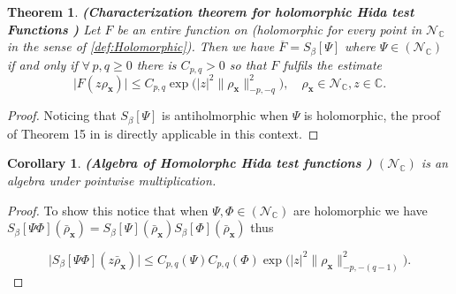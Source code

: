 \documentclass{elsarticle}%
\newtheorem{theorem}{Theorem}[section]%
\newtheorem{corollary}[corollary]{Corollary}%
\begin{document}
\begin{theorem} \textbf{(Characterization theorem for holomorphic Hida test Functions \cite{kondratievGeneralizedFunctionals1996})}
    Let $F$ be an entire function on  (holomorphic for every  point in $\mathcal{N}_{\mathbb{C}}$ in the sense of  \autoref{def:Holomorphic}).  Then we have $\overline{F}=S_{\beta}[\Psi]$ where $\Psi\in (\mathcal{N}_\mathbb{C})$ if and only if $\forall\,p,q\geq 0$ there is $C_{p,q}>0$ so that  $F$ fulfils the estimate    \begin{equation*}
        \lvert F(z \rho_{\mathbf{x}})\rvert \leq C_{p,q} \exp\Big(\lvert z \rvert^2\lVert \rho_{\mathbf{x}}\rVert_{-p,-q}^2\Big),\quad \rho_{\mathbf{x}}\in\mathcal{N}_{\mathbb{C}}, z\in \mathbb{C}.
    \end{equation*}
\end{theorem}
\begin{proof} 
Noticing that $S_{\beta}[\Psi]$ is antiholmorphic when $\Psi$ is holomorphic, the proof of Theorem 15 in   \cite{kondratievGeneralizedFunctionals1996} is directly applicable in this context. 
\end{proof}
\begin{corollary}\textbf{(Algebra of Homolorphc Hida test functions )}
     $(\mathcal{N}_\mathbb{C})$ is an algebra under pointwise multiplication. 
\end{corollary}
\begin{proof}
    To show this notice that when $\Psi,\Phi\in (\mathcal{N}_\mathbb{C})$ are holomorphic we have $S_{\beta}[\Psi\Phi](\bar\rho_{\mathbf{x}})=S_{\beta}[\Psi](\bar\rho_{\mathbf{x}})S_{\beta}[\Phi](\bar\rho_{\mathbf{x}})$ thus 

\begin{equation*}
    \lvert S_{\beta}[\Psi\Phi](z\bar\rho_{\mathbf{x}})\rvert \leq   C_{p,q}(\Psi)  C_{p,q}(\Phi)\exp\Big(\lvert z \rvert^2\lVert \rho_{\mathbf{x}}\rVert_{-p,-(q-1)}^2\Big).
\end{equation*}
\end{proof}
\end{document}
